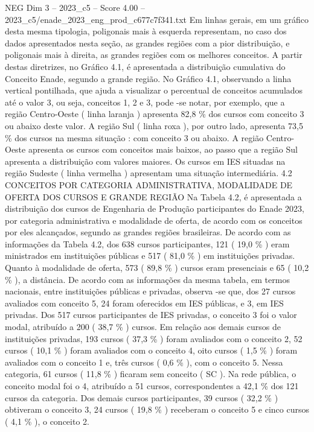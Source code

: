 \begin{textsample}{NEG Dim 3 – 2023\_c5 – Score 4.00 – 2023\_c5/enade\_2023\_eng\_prod\_c677c7f341.txt}
Em linhas gerais, em um gráfico desta mesma tipologia, poligonais mais à esquerda representam, no caso dos dados apresentados nesta seção, as grandes regiões com a pior distribuição, e poligonais mais à direita, as grandes regiões com os melhores conceitos.
A partir destas diretrizes, no Gráfico 4.1, é apresentada a distribuição cumulativa do Conceito Enade, segundo a grande região.
No Gráfico 4.1, observando a linha vertical pontilhada, que ajuda a visualizar o percentual de conceitos acumulados até o valor 3, ou seja, conceitos 1, 2 e 3, pode -se notar, por exemplo, que a região Centro-Oeste ( linha laranja ) apresenta 82,8 \% dos cursos com conceito 3 ou abaixo deste valor.
A região Sul ( linha roxa ), por outro lado, apresenta 73,5 \% dos cursos na mesma situação : com conceito 3 ou abaixo.
A região Centro-Oeste apresenta os cursos com conceitos mais baixos, ao passo que a região Sul apresenta a distribuição com valores maiores.
Os cursos em IES situadas na região Sudeste ( linha vermelha ) apresentam uma situação intermediária. 4.2 CONCEITOS POR CATEGORIA ADMINISTRATIVA, MODALIDADE DE OFERTA DOS CURSOS E GRANDE REGIÃO Na Tabela 4.2, é apresentada a distribuição dos cursos de Engenharia de Produção participantes do Enade 2023, por categoria administrativa e modalidade de oferta, de acordo com os conceitos por eles alcançados, segundo as grandes regiões brasileiras.
De acordo com as informações da Tabela 4.2, dos 638 cursos participantes, 121 ( 19,0 \% ) eram ministrados em instituições públicas e 517 ( 81,0 \% ) em instituições privadas.
Quanto à modalidade de oferta, 573 ( 89,8 \% ) cursos eram presenciais e 65 ( 10,2 \% ), a distância.
De acordo com as informações da mesma tabela, em termos nacionais, entre instituições públicas e privadas, observa -se que, dos 27 cursos avaliados com conceito 5, 24 foram oferecidos em IES públicas, e 3, em IES privadas.
Dos 517 cursos participantes de IES privadas, o conceito 3 foi o valor modal, atribuído a 200 ( 38,7 \% ) cursos.
Em relação aos demais cursos de instituições privadas, 193 cursos ( 37,3 \% ) foram avaliados com o conceito 2, 52 cursos ( 10,1 \% ) foram avaliados com o conceito 4, oito cursos ( 1,5 \% ) foram avaliados com o conceito 1 e, três cursos ( 0,6 \% ), com o conceito 5.
Nessa categoria, 61 cursos ( 11,8 \% ) ficaram sem conceito ( SC ).
Na rede pública, o conceito modal foi o 4, atribuído a 51 cursos, correspondentes a 42,1 \% dos 121 cursos da categoria.
Dos demais cursos participantes, 39 cursos ( 32,2 \% ) obtiveram o conceito 3, 24 cursos ( 19,8 \% ) receberam o conceito 5 e cinco cursos ( 4,1 \% ), o conceito 2.

\end{textsample}
